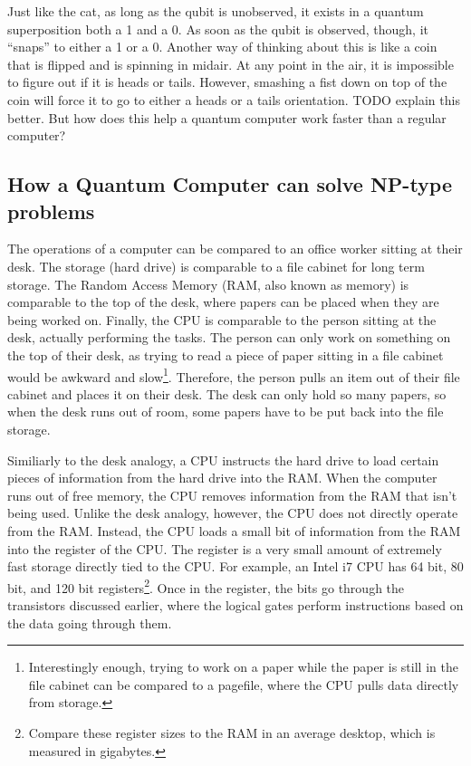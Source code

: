 \documentclass[10pt,journal,compsoc]{IEEEtran}
\begin{document}
Just like the cat, as long as the qubit is unobserved, it exists in a quantum superposition both a 1 and a 0. As soon as the qubit is observed, though, it ``snaps'' to either a 1 or a 0. Another way of thinking about this is like a coin that is flipped and is  spinning in midair. At any point in the air, it is impossible to figure out if it is heads or tails. However, smashing a fist down on top of the coin will force it to go to either a heads or a tails orientation. TODO explain this better. But how does this help a quantum computer work faster than a regular computer?







\subsection{How a Quantum Computer can solve NP-type problems}

The operations of a computer can be compared to an office worker sitting at their desk. The storage (hard drive) is comparable to a file cabinet for long term storage. The Random Access Memory (RAM, also known as memory) is comparable to the top of the desk, where papers can be placed when they are being worked on. Finally, the CPU is comparable to the person sitting at the desk, actually performing the tasks. The person can only work on something on the top of their desk, as trying to read a piece of paper sitting in a file cabinet would be awkward and slow\footnote{Interestingly enough, trying to work on a paper while the paper is still in the file cabinet can be compared to a pagefile, where the CPU pulls data directly from storage.}. Therefore, the person pulls an item out of their file cabinet and places it on their desk. The desk can only hold so many papers, so when the desk runs out of room, some papers have to be put back into the file storage. 



Similiarly to the desk analogy, a CPU instructs the hard drive to load certain pieces of information from the hard drive into the RAM. When the computer runs out of free memory, the CPU removes information from the RAM that isn't being used. Unlike the desk analogy, however, the CPU does not directly operate from the RAM. Instead, the CPU loads a small bit of information from the RAM into the register of the CPU. The register is a very small amount of extremely fast storage directly tied to the CPU. For example, an Intel i7 CPU has 64 bit, 80 bit, and 120 bit registers\footnote{Compare these register sizes to the RAM in an average desktop, which is measured in gigabytes.}. Once in the register, the bits go through the transistors discussed earlier, where the logical gates perform instructions based on the data going through them. 
\end{document}
